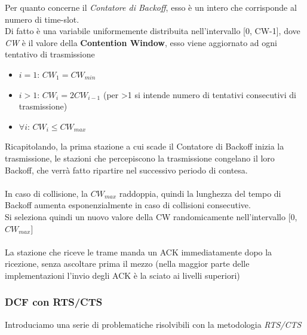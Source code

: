 \documentclass{article}
\begin{document}
                Per quanto concerne il \textit{Contatore di Backoff}, esso è un intero che corrisponde al numero di time-slot.\\
                Di fatto è una variabile uniformemente distribuita nell'intervallo [0, CW-1], dove \textit{CW} è il valore della \textbf{Contention Window}, esso viene aggiornato ad ogni tentativo di trasmissione
                \begin{itemize}
                    \item $ i=1 $: $ CW_1 = CW_{min} $
                    \item $ i>1 $: $ CW_i = 2CW_{i-1} $ (per >1 si intende numero di tentativi consecutivi di trasmissione)
                    \item $ \forall i  $: $ CW_i \leq CW_{max} $ 
                \end{itemize}
                Ricapitolando, la prima stazione a cui scade il Contatore di Backoff inizia la trasmissione, le stazioni che percepiscono la trasmissione congelano il loro Backoff, che verrà fatto ripartire nel successivo periodo di contesa.\\
                \\
                In caso di collisione, la $ CW_{max} $ raddoppia, quindi la lunghezza del tempo di Backoff aumenta esponenzialmente in caso di collisioni consecutive.\\
                Si seleziona quindi un nuovo valore della CW randomicamente nell'intervallo [0, $ CW_{max} $]\\
                \\
                La stazione che riceve le trame manda un ACK immediatamente dopo la ricezione, senza ascoltare prima il mezzo (nella maggior parte delle implementazioni l'invio degli ACK è la sciato ai livelli superiori)
                
            \subsubsection{DCF con RTS/CTS}
                Introduciamo una serie di problematiche risolvibili con la metodologia \textit{RTS/CTS}
\end{document}
